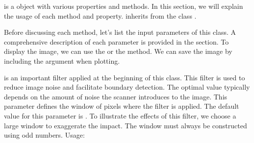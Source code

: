 \documentclass[letterpaper,10pt,english]{sphinxmanual}
\begin{document}
\begin{sphinxVerbatim}[commandchars=\\\{\}]
   
  
\end{sphinxVerbatim}

\sphinxAtStartPar
{} is a  object with various properties and methods. In this section,
we will explain the usage of each method and property.  inherits from the class .

\sphinxAtStartPar
Before discussing each method, let’s list the input parameters of this class.
A comprehensive description of each parameter is provided in the  section. To display the image, we can use the  or the  method.
We can save the image by including the argument  when plotting.

\begin{sphinxVerbatim}[commandchars=\\\{\}]
  
\end{sphinxVerbatim}


\sphinxAtStartPar
{} is an important filter applied at the beginning of this class.
This filter is used to reduce image noise and facilitate boundary detection.
The optimal value typically depends on the amount of noise the scanner introduces to the image.
This parameter defines the window of pixels where the filter is applied. The default value for this parameter is .
To illustrate the effects of this filter, we choose a large window to exaggerate the impact. The window must always be constructed using odd numbers.
Usage:
\end{document}
